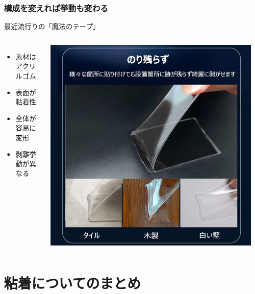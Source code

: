 \documentclass[unicode,12pt]{beamer}%
\begin{document}
\begin{frame}
	\frametitle{構成を変えれば挙動も変わる}
	\begin{block}{最近流行りの「魔法のテープ」}
		\begin{columns}[c, onlytextwidth]
			\begin{itemize}
				\item 素材はアクリルゴム
				\item 表面が粘着性
				\item 全体が容易に変形
				\item 剥離挙動が異なる
			\end{itemize}
			\centering
			\includegraphics[width=\textwidth]{support_effect.jpg}
		\end{columns}
	\end{block}
\end{frame}


\section{粘着についてのまとめ}
\end{document}
